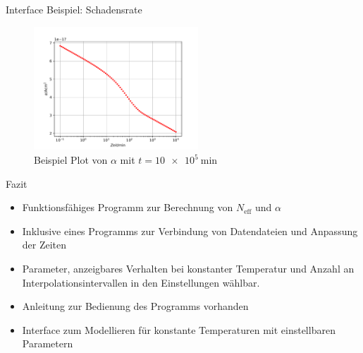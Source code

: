 \documentclass[aspectratio=1610, 9pt]{beamer}
\begin{document}
\begin{frame}{Interface Beispiel: Schadensrate}
  \begin{figure}
    \includegraphics[width=0.55\textwidth]{images/interface_damage.PDF}
    \caption{Beispiel Plot von $\alpha$ mit $t = \SI{10e5}{\minute}$}
  \end{figure}
\end{frame}

\begin{frame}{Fazit}
  \begin{itemize}
    \item Funktionsfähiges Programm zur Berechnung von $N_{\mathrm{eff}}$ und $\alpha$
    \medskip
    \item Inklusive eines Programms zur Verbindung von Datendateien und Anpassung der Zeiten
    \medskip
    \item Parameter, anzeigbares Verhalten bei konstanter Temperatur und Anzahl an Interpolationsintervallen in den
    Einstellungen wählbar.
    \medskip
    \item Anleitung zur Bedienung des Programms vorhanden
    \medskip
    \item Interface zum Modellieren für konstante Temperaturen mit einstellbaren Parametern
  \end{itemize}
\end{frame}
\end{document}
